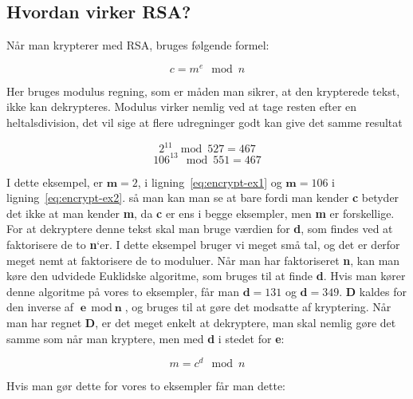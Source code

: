 \documentclass[a4paper,12pt]{extarticle}
\begin{document}
    \subsection{Hvordan virker RSA?}\label{subsec:hvordan-virker-rsa}
    Når man krypterer med RSA, bruges følgende formel:

    \begin{equation}
        c = m^e \mod n \label{eq:rsa-encrypt}
    \end{equation}

    Her bruges modulus regning, som er måden man sikrer, at den krypterede tekst, ikke kan dekrypteres.
    Modulus virker nemlig ved at tage resten efter en heltalsdivision,
    det vil sige at flere udregninger godt kan give det samme resultat

    \begin{equation}
        2^{11} \mod 527 = 467 \label{eq:encrypt-ex1}
    \end{equation}
    \begin{equation}
        106^{13} \mod 551 = 467 \label{eq:encrypt-ex2}
    \end{equation}

    I dette eksempel, er \(\textbf{m} = 2\), i ligning~\eqref{eq:encrypt-ex1} og \(\textbf{m} = 106\) i ligning~\eqref{eq:encrypt-ex2}.
    så man kan man se at bare fordi man kender \textbf{c} betyder det ikke at man kender \textbf{m},
    da \textbf{c} er ens i begge eksempler, men \textbf{m} er forskellige.
    For at dekryptere denne tekst skal man bruge værdien for \textbf{d}, som findes ved at faktorisere de to \textbf{n}`er.
    I dette eksempel bruger vi meget små tal, og det er derfor meget nemt at faktorisere de to moduluer.
    Når man har faktoriseret \textbf{n}, kan man køre den udvidede Euklidske algoritme, som bruges til at finde \textbf{d}.
    Hvis man kører denne algoritme på vores to eksempler, får man \(\textbf{d} = 131\) og \(\textbf{d} = 349\).\@
    \textbf{D} kaldes for den inverse af \(\textbf{e} \mod \textbf{n}\), og bruges til at gøre det modsatte af kryptering.
    Når man har regnet \textbf{D}, er det meget enkelt at dekryptere, man skal nemlig gøre det samme som når man kryptere,
    men med \textbf{d} i stedet for \textbf{e}:

    \begin{equation}
        m = c^d \mod n \label{eq:rsa-decrypt}
    \end{equation}

    Hvis man gør dette for vores to eksempler får man dette:
\end{document}
